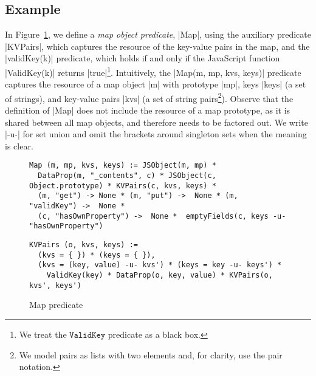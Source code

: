 \subsection{Example} 

In Figure~\ref{fig:map:example}, we define a \emph{map object predicate}, \jsinline|Map|, 
using the auxiliary predicate \jsinline|KVPairs|, which captures the resource of the key-value pairs in the map, 
and the \jsinline|validKey(k)| predicate, which holds if and only if the 
JavaScript function \jsinline|ValidKey(k)| returns \jsinline|true|\footnote{We treat the $\mathtt{ValidKey}$ predicate as a black box.}.
%
Intuitively, the \jsinline|Map(m, mp, kvs, keys)| predicate captures the resource 
of a map object \jsinline|m| with prototype \jsinline|mp|, keys \jsinline|keys| (a set of strings),
and key-value pairs \jsinline|kvs| (a set of string pairs\footnote{We model pairs as lists with two elements and, for clarity, use the pair notation.}). 
Observe that the definition of \jsinline|Map| does not include the resource of a map prototype, as
it is shared between all map objects, and therefore needs to be factored out.  
%
We write \jsinline|-u-| for set union and omit the brackets around singleton 
sets when the meaning is clear. %

\begin{figure}[t!]
{\scriptsize
 \begin{verbatim}
Map (m, mp, kvs, keys) := JSObject(m, mp) * 
  DataProp(m, "_contents", c) * JSObject(c, Object.prototype) * KVPairs(c, kvs, keys) *
  (m, "get") -> None * (m, "put") ->  None * (m, "validKey") ->  None * 
  (c, "hasOwnProperty") ->  None *  emptyFields(c, keys -u- "hasOwnProperty")
  \end{verbatim}
  \vspace*{-0.3cm}
 \begin{verbatim}
KVPairs (o, kvs, keys) := 
  (kvs = { }) * (keys = { }),
  (kvs = (key, value) -u- kvs') * (keys = key -u- keys') * 
    ValidKey(key) * DataProp(o, key, value) * KVPairs(o, kvs', keys')
\end{verbatim}}
\caption{Map predicate \label{fig:map:example}}
\end{figure}



